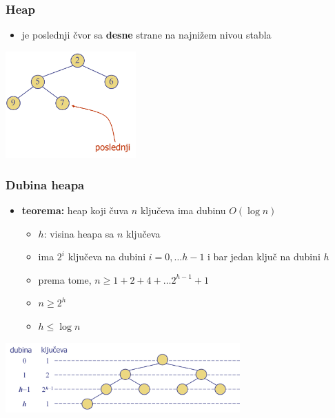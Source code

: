 \documentclass[compress,aspectratio=169]{beamer}
\begin{document}
\begin{frame}[fragile]
  \frametitle{Heap}
  \begin{itemize}
    \item {} je poslednji čvor sa \textbf{desne} strane na
    najnižem nivou stabla
  \end{itemize}
  \begin{center}
    \includegraphics[width=5cm]{asp-09-pic03.png}
  \end{center}
\end{frame}

\begin{frame}[fragile]
  \frametitle{Dubina heapa}
  \begin{itemize}
    \item \textbf{teorema:} heap koji čuva $n$ ključeva ima dubinu $O(\log n)$
    \begin{itemize}
      \item $h$: visina heapa sa $n$ ključeva
      \item ima $2^i$ ključeva na dubini $i = 0, \ldots h-1$ i bar jedan ključ
      na dubini $h$
      \item prema tome, $n \geq 1 + 2 + 4 + \ldots 2^{h-1} + 1$
      \item $n \geq 2^h$
      \item $h \leq \log n$
    \end{itemize}
  \end{itemize}
  \begin{center}
    \includegraphics[width=9cm]{asp-09-pic04.png}
  \end{center}
\end{frame}
\end{document}

